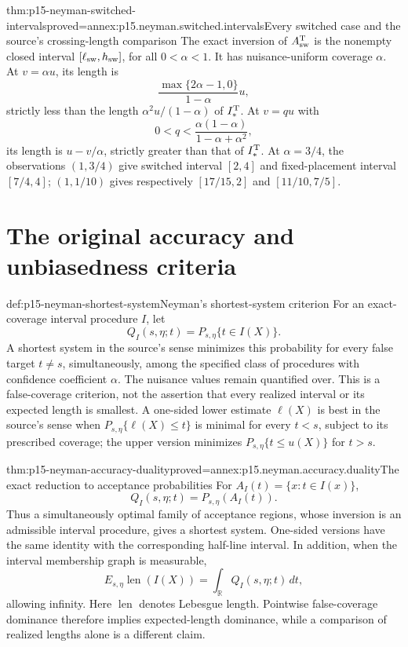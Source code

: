 \begin{hbtheorem}{thm:p15-neyman-switched-intervals}{proved=annex:p15.neyman.switched.intervals}{Every switched case and the source's crossing-length comparison}
The exact inversion of \(A_{\rm sw}^{\rm T}\) is the nonempty
closed interval \([\ell_{\rm sw},h_{\rm sw}]\), for all
\(0<\alpha<1\). It has nuisance-uniform coverage \(\alpha\).
At \(v=\alpha u\), its length is
\[
                       \frac{\max\{2\alpha-1,0\}}{1-\alpha}u,
\]
strictly less than the length \(\alpha^2u/(1-\alpha)\) of
\(I_*^{\rm T}\). At \(v=qu\) with
\[
                      0<q<\frac{\alpha(1-\alpha)}
                                         {1-\alpha+\alpha^2},
\]
its length is \(u-v/\alpha\), strictly greater than that
of \(I_*^{\rm T}\).
At \(\alpha=3/4\), the observations \((1,3/4)\) give
switched interval \([2,4]\) and fixed-placement interval
\([7/4,4]\); \((1,1/10)\) gives respectively
\([17/15,2]\) and \([11/10,7/5]\).
\end{hbtheorem}

\section{The original accuracy and unbiasedness criteria}

\begin{hbdefinition}{def:p15-neyman-shortest-system}{Neyman's shortest-system criterion}
For an exact-coverage interval procedure \(I\), let
\[
                     Q_I(s,\eta;t)=P_{s,\eta}\{t\in I(X)\}.
\]
A shortest system in the source's sense minimizes this probability
for every false target \(t\ne s\), simultaneously, among the
specified class of procedures with confidence coefficient \(\alpha\).
The nuisance values remain quantified over.
This is a false-coverage criterion, not the assertion that every
realized interval or its expected length is smallest.
A one-sided lower estimate \(\ell(X)\) is best in the source's
sense when \(P_{s,\eta}\{\ell(X)\leq t\}\) is minimal for
every \(t<s\), subject to its prescribed coverage; the upper
version minimizes \(P_{s,\eta}\{t\leq u(X)\}\) for \(t>s\).
\end{hbdefinition}

\begin{hbtheorem}{thm:p15-neyman-accuracy-duality}{proved=annex:p15.neyman.accuracy.duality}{The exact reduction to acceptance probabilities}
For \(A_I(t)=\{x:t\in I(x)\}\),
\[
                             Q_I(s,\eta;t)=P_{s,\eta}(A_I(t)).
\]
Thus a simultaneously optimal family of acceptance regions,
whose inversion is an admissible interval procedure, gives a
shortest system. One-sided versions have the same identity with
the corresponding half-line interval.
In addition, when the interval membership graph is measurable,
\[
                             E_{s,\eta}\operatorname{len}(I(X))
                              =\int_{\mathbb R}Q_I(s,\eta;t)\,dt,
\]
allowing infinity. Here \(\operatorname{len}\) denotes Lebesgue length.
Pointwise false-coverage dominance therefore implies expected-length
dominance, while a comparison of realized lengths alone is a
different claim.
\end{hbtheorem}

